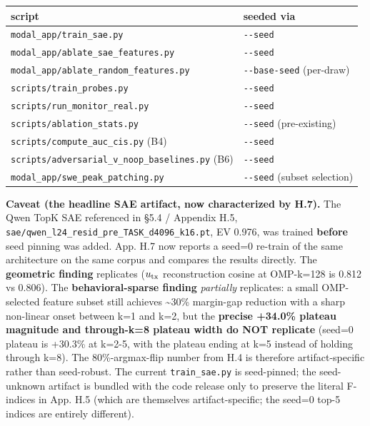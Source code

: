 \documentclass[
  11pt,
  a4paper]{article}
\newcounter{none} %
\begin{document}
{\def\LTcaptype{none} %
\begin{longtable}[]{@{}
  >{\raggedright\arraybackslash}p{}
  >{\raggedright\arraybackslash}p{}@{}}
\toprule\noalign{}
\begin{minipage}[b]{\linewidth}\raggedright
script
\end{minipage} & \begin{minipage}[b]{\linewidth}\raggedright
seeded via
\end{minipage} \\
\midrule\noalign{}
\endhead
\bottomrule\noalign{}
\endlastfoot
\texttt{modal\_app/train\_sae.py} & \texttt{-\/-seed} \\
\texttt{modal\_app/ablate\_sae\_features.py} & \texttt{-\/-seed} \\
\texttt{modal\_app/ablate\_random\_features.py} & \texttt{-\/-base-seed}
(per-draw) \\
\texttt{scripts/train\_probes.py} & \texttt{-\/-seed} \\
\texttt{scripts/run\_monitor\_real.py} & \texttt{-\/-seed} \\
\texttt{scripts/ablation\_stats.py} & \texttt{-\/-seed}
(pre-existing) \\
\texttt{scripts/compute\_auc\_cis.py} (B4) & \texttt{-\/-seed} \\
\texttt{scripts/adversarial\_v\_noop\_baselines.py} (B6) &
\texttt{-\/-seed} \\
\texttt{modal\_app/swe\_peak\_patching.py} & \texttt{-\/-seed} (subset
selection) \\
\end{longtable}
}

\textbf{Caveat (the headline SAE artifact, now characterized by H.7).}
The Qwen TopK SAE referenced in \S{}5.4 / Appendix H.5,
\texttt{sae/qwen\_l24\_resid\_pre\_TASK\_d4096\_k16.pt}, EV 0.976, was
trained \textbf{before} seed pinning was added. App. H.7 now reports a
seed=0 re-train of the same architecture on the same corpus and compares
the results directly. The \textbf{geometric finding} replicates
(\(u_{\rm tx}\) reconstruction cosine at OMP-k=128 is 0.812 vs 0.806).
The \textbf{behavioral-sparse finding} \emph{partially} replicates: a
small OMP-selected feature subset still achieves \textasciitilde30\%
margin-gap reduction with a sharp non-linear onset between k=1 and k=2,
but the \textbf{precise +34.0\% plateau magnitude and through-k=8
plateau width do NOT replicate} (seed=0 plateau is +30.3\% at k=2-5,
with the plateau ending at k=5 instead of holding through k=8). The
80\%-argmax-flip number from H.4 is therefore artifact-specific rather
than seed-robust. The current \texttt{train\_sae.py} is seed-pinned; the
seed-unknown artifact is bundled with the code release only to preserve
the literal F-indices in App. H.5 (which are themselves
artifact-specific; the seed=0 top-5 indices are entirely different).
\end{document}
